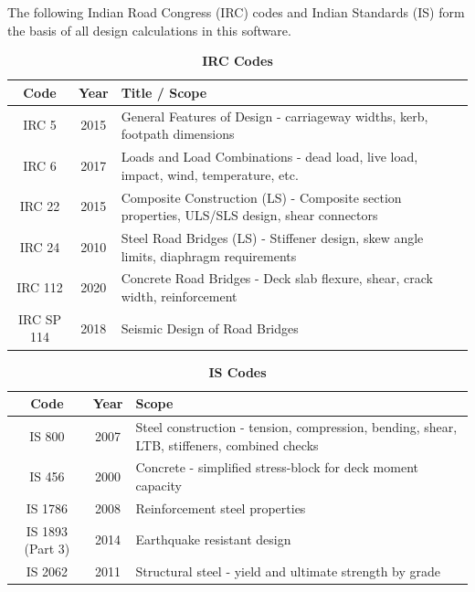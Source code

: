 \documentclass[12pt,a4paper]{report}
\numberwithin{table}{chapter}
\numberwithin{figure}{chapter}
\begin{document}
The following Indian Road Congress (IRC) codes and Indian Standards (IS)
form the basis of all design calculations in this software.

\vspace{0.5cm}

\begingroup
\setlength{\tabcolsep}{3.5pt}
\begin{table}[H]
\caption{\textbf{IRC Codes}}
\begin{tabular}{|c|c|p{13cm}|}
\hline
\textbf{Code} & \textbf{Year} & \textbf{Title / Scope} \\
\hline
IRC 5 & 2015 & General Features of Design - carriageway widths, kerb, footpath dimensions \\
\hline
IRC 6 & 2017 & Loads and Load Combinations - dead load, live load, impact, wind, temperature, etc. \\
\hline
IRC 22 & 2015 & Composite Construction (LS) - Composite section properties, ULS/SLS design, shear connectors \\
\hline
IRC 24 & 2010 & Steel Road Bridges (LS) - Stiffener design, skew angle limits, diaphragm requirements \\
\hline
IRC 112 & 2020 & Concrete Road Bridges - Deck slab flexure, shear, crack width, reinforcement \\
\hline
IRC SP 114 & 2018 & Seismic Design of Road Bridges \\
\hline
\end{tabular}
\end{table}

\begingroup
\setlength{\tabcolsep}{3.5pt}
\begin{table}[H]
\caption{\textbf{IS Codes}}
\begin{tabular}{|c|c|p{13cm}|}
\hline
\textbf{Code} & \textbf{Year} & \textbf{Scope} \\
\hline
IS 800 & 2007 & Steel construction - tension, compression, bending, shear, LTB, stiffeners, combined checks \\
\hline
IS 456 & 2000 & Concrete - simplified stress-block for deck moment capacity \\
\hline
IS 1786 & 2008 & Reinforcement steel properties \\
\hline
IS 1893 (Part 3) & 2014 & Earthquake resistant design \\
\hline
IS 2062 & 2011 & Structural steel - yield and ultimate strength by grade \\
\hline
\end{tabular}
\end{table}
\end{document}
